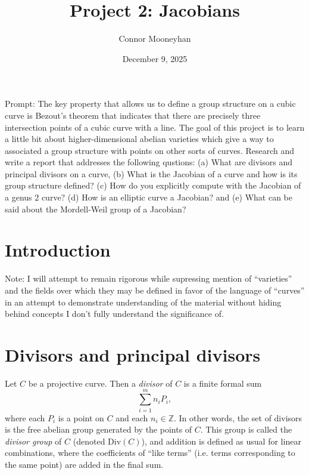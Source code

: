 \documentclass[12pt]{article}
\title{Project 2: Jacobians}
\author{Connor Mooneyhan}
\date{December 9, 2025}
\theoremstyle{definition}
\begin{document}
\maketitle

Prompt: The key property that allows us to define a group structure on a cubic curve is Bezout’s theorem that indicates that there are precisely three intersection points of a cubic curve with a line.
The goal of this project is to learn a little bit about higher-dimensional abelian varieties which give a way to associated a group structure with points on other sorts of curves.
Research and write a report that addresses the following qustions: (a) What are divisors and principal divisors on a curve, (b) What is the Jacobian of a curve and how is its group structure defined? (c) How do you explicitly compute with the Jacobian of a genus 2 curve? (d) How is an elliptic curve a Jacobian? and (e) What can be said about the Mordell-Weil group of a Jacobian?

\section{Introduction}

Note: I will attempt to remain rigorous while supressing mention of ``varieties'' and the fields over which they may be defined in favor of the language of ``curves'' in an attempt to demonstrate understanding of the material without hiding behind concepts I don't fully understand the significance of.
\section{Divisors and principal divisors}
Let $C$ be a projective curve.
Then a \textit{divisor} of $C$ is a finite formal sum \begin{equation}\label{divisor}
	\sum_{i=1}^m n_iP_i,
\end{equation}
where each $P_i$ is a point on $C$ and each $n_i \in \mathbb{Z}$.
In other words, the set of divisors is the free abelian group generated by the points of $C$.
This group is called the \textit{divisor group} of $C$ (denoted $\mathrm{Div}(C)$), and addition is defined as usual for linear combinations, where the coefficients of ``like terms'' (i.e. terms corresponding to the same point) are added in the final sum.
\end{document}
